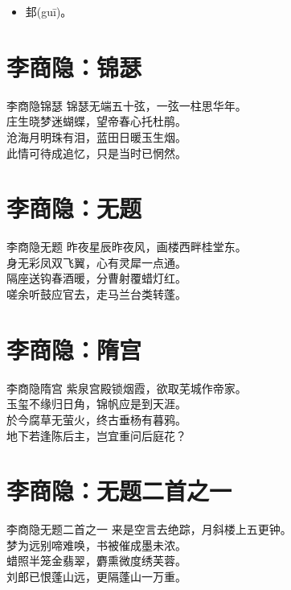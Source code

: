 \documentclass[12pt,oneside,a5paper]{book}
\begin{document}
\begin{itemize}
\item 邽(guī)。
\end{itemize}

\chapter{李商隐：锦瑟}
\begin{poemzh}{李商隐}{锦瑟}
锦瑟无端五十弦，一弦一柱思华年。\\
庄生晓梦迷蝴蝶，望帝春心托杜鹃。\\
沧海月明珠有泪，蓝田日暖玉生烟。\\
此情可待成追忆，只是当时已惘然。\\ 
\end{poemzh}

\chapter{李商隐：无题}
\begin{poemzh}{李商隐}{无题}
昨夜星辰昨夜风，画楼西畔桂堂东。\\
身无彩凤双飞翼，心有灵犀一点通。\\
隔座送钩春酒暖，分曹射覆蜡灯红。\\
嗟余听鼓应官去，走马兰台类转蓬。\\ 
\end{poemzh}

\chapter{李商隐：隋宫}
\begin{poemzh}{李商隐}{隋宫}
紫泉宫殿锁烟霞，欲取芜城作帝家。\\
玉玺不缘归日角，锦帆应是到天涯。\\
於今腐草无萤火，终古垂杨有暮鸦。\\
地下若逢陈后主，岂宜重问后庭花？\\ 
\end{poemzh}

\chapter{李商隐：无题二首之一}
\begin{poemzh}{李商隐}{无题二首之一}
来是空言去绝踪，月斜楼上五更钟。\\
梦为远别啼难唤，书被催成墨未浓。\\
蜡照半笼金翡翠，麝熏微度绣芙蓉。\\
刘郎已恨蓬山远，更隔蓬山一万重。\\ 
\end{poemzh}
\end{document}
